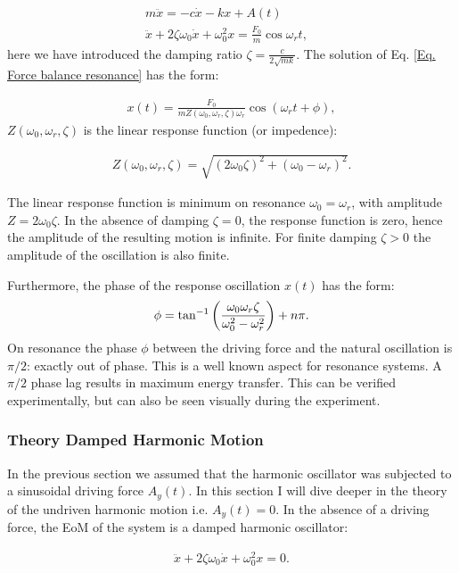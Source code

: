 \documentclass{article}
\begin{document}
\begin{align}
    m\ddot{x} = -c\dot{x} - kx + A(t) & \\
    \ddot{x} + 2\zeta\omega_0\dot{x} +\omega_0^2x = \frac{F_0}{m}\cos{\omega_r t},
    \label{Eq. Force balance resonance}
\end{align}
here we have introduced the damping ratio $\zeta = \frac{c}{2\sqrt{mk}}$. The solution of Eq. \ref{Eq. Force balance resonance} has the form:

\begin{align}
    x(t) = \frac{F_0}{m Z(\omega_0,\omega_r,\zeta) \omega_r}\cos(\omega_r t + \phi),
\end{align}
$Z(\omega_0,\omega_r,\zeta)$ is the linear response function (or impedence):

\begin{align}
    Z(\omega_0,\omega_r,\zeta) = \sqrt{(2\omega_0\zeta)^2 + (\omega_0-\omega_r)^2}.
\end{align}

The linear response function is minimum on resonance $\omega_0=\omega_r$, with amplitude $Z = 2\omega_0\zeta$. In the absence of damping $\zeta = 0$, the response function is zero, hence the amplitude of the resulting motion is infinite. For finite damping $\zeta > 0$ the amplitude of the oscillation is also finite.

Furthermore, the phase of the response oscillation $x(t)$ has the form: 
\begin{align}
    \phi = \tan^{-1}\bigg{(}\frac{\omega_0\omega_r\zeta}{\omega_0^2-\omega_r^2}\bigg{)} + n\pi.
\end{align}
On resonance the phase $\phi$ between the driving force and the natural oscillation is $\pi/2$: exactly out of phase. This is a well known aspect for resonance systems. A $\pi/2$ phase lag results in maximum energy transfer. This can be verified experimentally, but can also be seen visually during the experiment. 

\subsubsection{Theory Damped Harmonic Motion}
In the previous section we assumed that the harmonic oscillator was subjected to a sinusoidal driving force $A_y(t)$. In this section I will dive deeper in the theory of the undriven harmonic motion i.e. $A_y(t) = 0$. In the absence of a driving force, the EoM of the system is a damped harmonic oscillator:

\begin{align}
    \ddot{x} + 2\zeta\omega_0\dot{x} +\omega_0^2x = 0.
    \label{Eq. Force balance damping}
\end{align}
\end{document}
